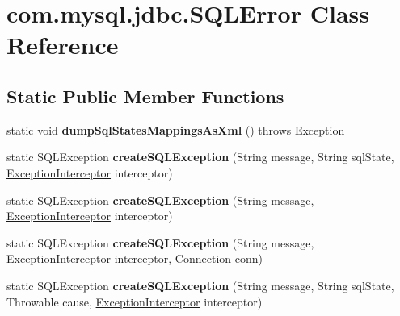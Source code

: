 \hypertarget{classcom_1_1mysql_1_1jdbc_1_1_s_q_l_error}{}\section{com.\+mysql.\+jdbc.\+S\+Q\+L\+Error Class Reference}
\label{classcom_1_1mysql_1_1jdbc_1_1_s_q_l_error}
\subsection*{Static Public Member Functions}
\begin{DoxyCompactItemize}
\item 
\mbox{\label{classcom_1_1mysql_1_1jdbc_1_1_s_q_l_error_aae5e3f92608cd9b37e9d7d5f5ec31120}} 
static void {\bfseries dump\+Sql\+States\+Mappings\+As\+Xml} ()  throws Exception 
\item 
\mbox{\label{classcom_1_1mysql_1_1jdbc_1_1_s_q_l_error_a511c7b1d899e5b7da2aebabc8fefdea9}} 
static S\+Q\+L\+Exception {\bfseries create\+S\+Q\+L\+Exception} (String message, String sql\+State, \mbox{\hyperlink{interfacecom_1_1mysql_1_1jdbc_1_1_exception_interceptor}{Exception\+Interceptor}} interceptor)
\item 
\mbox{\label{classcom_1_1mysql_1_1jdbc_1_1_s_q_l_error_a48ef74f40587af1f3f76e81ceec0c97a}} 
static S\+Q\+L\+Exception {\bfseries create\+S\+Q\+L\+Exception} (String message, \mbox{\hyperlink{interfacecom_1_1mysql_1_1jdbc_1_1_exception_interceptor}{Exception\+Interceptor}} interceptor)
\item 
\mbox{\label{classcom_1_1mysql_1_1jdbc_1_1_s_q_l_error_a4f8fcf999a4c65f233e96222bac07e03}} 
static S\+Q\+L\+Exception {\bfseries create\+S\+Q\+L\+Exception} (String message, \mbox{\hyperlink{interfacecom_1_1mysql_1_1jdbc_1_1_exception_interceptor}{Exception\+Interceptor}} interceptor, \mbox{\hyperlink{interfacecom_1_1mysql_1_1jdbc_1_1_connection}{Connection}} conn)
\item 
\mbox{\label{classcom_1_1mysql_1_1jdbc_1_1_s_q_l_error_a4e22c9fe970ce317c2e99719bc1dff8c}} 
static S\+Q\+L\+Exception {\bfseries create\+S\+Q\+L\+Exception} (String message, String sql\+State, Throwable cause, \mbox{\hyperlink{interfacecom_1_1mysql_1_1jdbc_1_1_exception_interceptor}{Exception\+Interceptor}} interceptor)

\end{DoxyCompactItemize}
